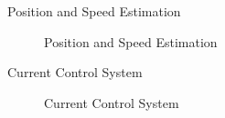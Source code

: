 \begin{frame}{Position and Speed Estimation}
	\begin{figure}
		\centering

		\caption{Position and Speed Estimation}
	\end{figure}
\end{frame}


\begin{frame}{Current Control System}
	\begin{figure}
		\centering

		\caption{Current Control System}
	\end{figure}
\end{frame}



